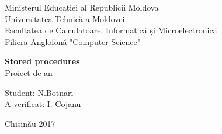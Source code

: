 \begin{titlepage}

\newcommand{\HRule}{\rule{\linewidth}{0.5mm}} %

\center

Ministerul Educației al Republicii Moldova\\ %
Universitatea Tehnică a Moldovei \\%
Facultatea de Calculatoare, Informatică și Microelectronică\\
Filiera Anglofonă "Computer Science"\\


\vspace{2cm}
\vspace{2cm}








\begin{center}
\Large \textbf{Stored procedures}\\
\vspace{0.6cm}
Proiect de an
\end{center}
\vspace{1cm}

\vspace{2cm}
\vspace{2cm}


\hfill Student: N.Botnari \\
\vspace{0.2cm}
\hfill A verificat: I. Cojanu




\vfill %
\begin{center}
Chișinău 2017
\end{center}


\end{titlepage}

